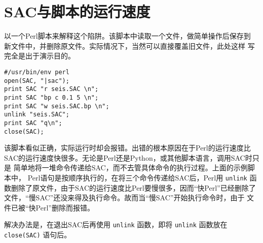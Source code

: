 \section{SAC与脚本的运行速度}
以一个Perl脚本来解释这个陷阱。该脚本中读取一个文件，做简单操作后保存到
新文件中，并删除原文件。实际情况下，当然可以直接覆盖旧文件，此处这样
写完全是出于演示目的。
\begin{verbatim}
#/usr/bin/env perl
open(SAC, "|sac");
print SAC "r seis.SAC \n";
print SAC "bp c 0.1 5 \n";
print SAC "w seis.SAC.bp \n";
unlink "seis.SAC";
print SAC "q\n";
close(SAC);
\end{verbatim}
该脚本看似正确，实际运行时却会报错。出错的根本原因在于Perl的运行速度比
SAC的运行速度快很多。无论是Perl还是Python，或其他脚本语言，调用SAC时只是
简单地将一堆命令传递给SAC，而不去管具体命令的执行过程。上面的示例脚本中，
Perl语句是按顺序执行的，在将三个命令传递给SAC后，Perl用 \texttt{unlink}
函数删除了原文件，由于SAC的运行速度比Perl要慢很多，因而``快Perl''已经删除了
文件，``慢SAC''还没来得及执行命令。故而当``慢SAC''开始执行命令时，由于
文件已被``快Perl''删除而报错。

解决办法是，在退出SAC后再使用 \texttt{unlink} 函数，即将 \texttt{unlink}
函数放在 \texttt{close(SAC)} 语句后。
